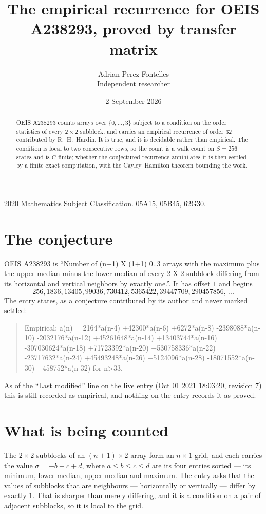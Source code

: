 \documentclass[11pt,a4paper]{article}
\title{The empirical recurrence for OEIS A238293, proved by transfer matrix}
\author{Adrian Perez Fontelles\\ \small Independent researcher}
\date{2 September 2026}
\theoremstyle{plain}
\theoremstyle{definition}
\begin{document}
\maketitle

\begin{abstract}
OEIS A238293 counts arrays over $\{0,\dots,3\}$ subject to a condition on the order
statistics of every $2\times2$ subblock, and carries an empirical recurrence of order
$32$ contributed by R.~H.~Hardin. It is true, and it is decidable rather than empirical.
The condition is local to two consecutive rows, so the count is a walk count on $S=256$
states and is $C$-finite; whether the conjectured recurrence annihilates it is then settled by
a finite exact computation, with the Cayley--Hamilton theorem bounding the work.
\end{abstract}

\noindent\small 2020 Mathematics Subject Classification. 05A15, 05B45, 62G30.\normalsize

\section{The conjecture}

OEIS A238293 is ``Number of (n+1) X (1+1) 0..3 arrays with the maximum plus the upper median minus the lower median of every 2 X 2 subblock differing from its horizontal and vertical neighbors by exactly one.''. It has offset $1$ and begins
\[
256, 1836, 13405, 99036, 730412, 5365422, 39447709, 290457856,\ \dots
\]
The entry states, as a conjecture contributed by its author and never marked settled:
\begin{quote}
Empirical: a(n) = 2164*a(n-4) +42300*a(n-6) +6272*a(n-8) -2398088*a(n-10) -2032176*a(n-12) +45261648*a(n-14) +13403744*a(n-16) -307030624*a(n-18) +71723392*a(n-20) +530758336*a(n-22) -23717632*a(n-24) +45493248*a(n-26) +5124096*a(n-28) -18071552*a(n-30) +458752*a(n-32) for n>33.
\end{quote}
As of the ``Last modified'' line on the live entry (Oct 01 2021 18:03:20, revision 7) this is still
recorded as empirical, and nothing on the entry records it as proved.

\section{What is being counted}

The $2\times2$ subblocks of an $(n+1)\times2$ array form an
$n\times1$ grid, and each carries the value $\sigma=-b+c+d$, where $a\le b\le c\le d$ are its four entries sorted --- its minimum, lower median, upper median and maximum. The entry asks that the values of
subblocks that are neighbours --- horizontally or vertically --- differ by exactly $1$.
That is sharper than merely differing, and it is a condition on a pair of adjacent subblocks,
so it is local to the grid.
\end{document}
